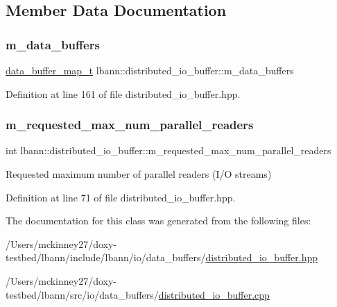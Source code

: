 \subsection{Member Data Documentation}
\mbox{\label{classlbann_1_1distributed__io__buffer_a59ef8621c57755f73671b782e11dbe89}} 
\subsubsection{\texorpdfstring{m\+\_\+data\+\_\+buffers}{m\_data\_buffers}}
{\footnotesize\ttfamily \hyperlink{classlbann_1_1distributed__io__buffer_a7567d3d06f96b001c118f9979bebb0b9}{data\+\_\+buffer\+\_\+map\+\_\+t} lbann\+::distributed\+\_\+io\+\_\+buffer\+::m\+\_\+data\+\_\+buffers}



Definition at line 161 of file distributed\+\_\+io\+\_\+buffer.\+hpp.

\mbox{\label{classlbann_1_1distributed__io__buffer_aa14580fd9d0e8806dc161745525a60dc}} 
\subsubsection{\texorpdfstring{m\+\_\+requested\+\_\+max\+\_\+num\+\_\+parallel\+\_\+readers}{m\_requested\_max\_num\_parallel\_readers}}
{\footnotesize\ttfamily int lbann\+::distributed\+\_\+io\+\_\+buffer\+::m\+\_\+requested\+\_\+max\+\_\+num\+\_\+parallel\+\_\+readers}

Requested maximum number of parallel readers (I/O streams) 

Definition at line 71 of file distributed\+\_\+io\+\_\+buffer.\+hpp.



The documentation for this class was generated from the following files\+:\begin{DoxyCompactItemize}
\item 
/\+Users/mckinney27/doxy-\/testbed/lbann/include/lbann/io/data\+\_\+buffers/\hyperlink{distributed__io__buffer_8hpp}{distributed\+\_\+io\+\_\+buffer.\+hpp}\item 
/\+Users/mckinney27/doxy-\/testbed/lbann/src/io/data\+\_\+buffers/\hyperlink{distributed__io__buffer_8cpp}{distributed\+\_\+io\+\_\+buffer.\+cpp}\end{DoxyCompactItemize}
